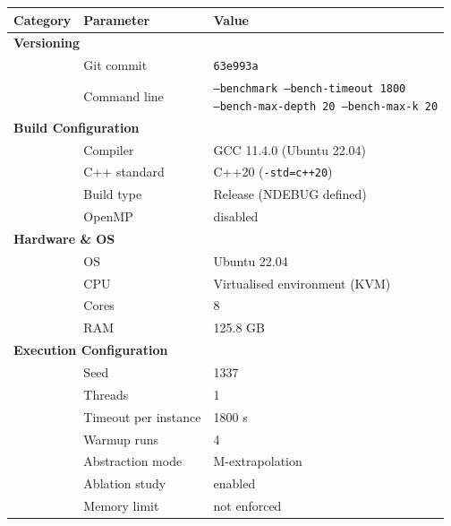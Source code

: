 \begin{table}[t]
\centering
\small
\setlength{\tabcolsep}{6pt}
\renewcommand{\arraystretch}{1.15}
\begin{tabular}{@{}lll@{}}
\toprule
\textbf{Category} & \textbf{Parameter} & \textbf{Value} \\
\midrule

\multicolumn{3}{l}{\textbf{Versioning}} \\
\midrule
 & Git commit & \texttt{63e993a} \\
 & Command line & \shortstack{\texttt{--benchmark --bench-timeout 1800}\\ \texttt{--bench-max-depth 20 --bench-max-k 20}} \\

\midrule
\multicolumn{3}{l}{\textbf{Build Configuration}} \\
\midrule
 & Compiler & GCC 11.4.0 (Ubuntu 22.04) \\
 & C++ standard & C++20 (\texttt{-std=c++20}) \\
 & Build type & Release (NDEBUG defined) \\
 & OpenMP & disabled \\

\midrule
\multicolumn{3}{l}{\textbf{Hardware \& OS}} \\
\midrule
 & OS & Ubuntu 22.04 \\
 & CPU & Virtualised environment (KVM) \\
 & Cores & 8 \\
 & RAM & 125.8 GB \\

\midrule
\multicolumn{3}{l}{\textbf{Execution Configuration}} \\
\midrule
 & Seed & 1337 \\
 & Threads & 1 \\
 & Timeout per instance & 1800 s \\
 & Warmup runs & 4 \\
 & Abstraction mode & M-extrapolation \\
 & Ablation study & enabled \\
 & Memory limit & not enforced \\


\end{tabular}
\end{table}
